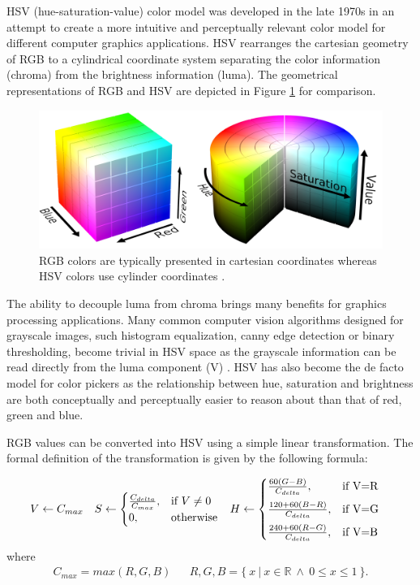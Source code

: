 \documentclass[thesis.tex]{subfiles}
\begin{document}
HSV (hue-saturation-value) color model was developed in the late 1970s in an attempt to create a more intuitive and perceptually relevant color model for different computer graphics applications. HSV rearranges the cartesian geometry of RGB to a cylindrical coordinate system separating the color information (chroma) from the brightness information (luma). The geometrical representations of RGB and HSV are depicted in Figure \ref{figure:rgb_hsv} for comparison.

\begin{figure}[hb]
\centering \includegraphics[width=\textwidth]{images/rgb_hsv}
\caption{RGB colors are typically presented in cartesian coordinates whereas HSV colors use cylinder coordinates \cite{hsv_cylinder}\cite{rgb_cube}.\label{figure:rgb_hsv}}
\end{figure}

The ability to decouple luma from chroma brings many benefits for graphics processing applications. Many common computer vision algorithms designed for grayscale images, such histogram equalization, canny edge detection or binary thresholding, become trivial in HSV space as the grayscale information can be read directly from the luma component (V) \cite{color_segmentation}. HSV has also become the de facto model for color pickers as the relationship between hue, saturation and brightness are both conceptually and perceptually easier to reason about than that of red, green and blue.

RGB values can be converted into HSV using a simple linear transformation. The formal definition of the transformation is given by the following formula:

\begin{align}
V &\leftarrow C_{max}	&
S &\leftarrow
	\begin{cases}
		\frac{C_{delta}}{C_{max}}, & \text{if $V\neq0$}\\
		0, & \text{otherwise}
	\end{cases}			&
H &\leftarrow
	\begin{cases}
		\frac{60(G-B)}{C_{delta}}, & \text{if V=R}\vspace{2mm}\\
		\frac{120+60(B-R)}{C_{delta}}, & \text{if V=G}\vspace{2mm}\\
		\frac{240+60(R-G)}{C_{delta}}, & \text{if V=B}
	\end{cases}
\end{align}
\noindent where
\begin{align*}
C_{max}=max(R, G, B)	&			&
R, G, B = \{\ x\ \vert\ x \in \mathbb R\ \wedge\ 0 \leq x \leq 1\ \}.
\end{align*}
\end{document}
